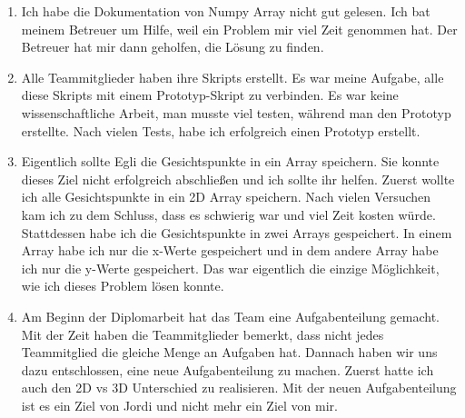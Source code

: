 \begin{itemize}
\begin{enumerate}
	\item Ich habe die Dokumentation von Numpy Array nicht gut gelesen. Ich bat meinem Betreuer um Hilfe, weil ein Problem mir viel Zeit genommen hat. Der Betreuer hat mir dann geholfen, die L\"osung zu finden. 
	
	\item Alle Teammitglieder haben ihre Skripts erstellt. Es war meine Aufgabe, alle diese Skripts mit einem Prototyp-Skript zu verbinden. Es war keine wissenschaftliche Arbeit, man musste viel testen, w\"ahrend man den Prototyp erstellte. Nach vielen Tests, habe ich erfolgreich einen Prototyp erstellt.
	
	\item Eigentlich sollte Egli die Gesichtspunkte in ein Array speichern. Sie konnte dieses Ziel nicht erfolgreich abschlie{\ss}en und ich sollte ihr helfen. Zuerst wollte ich alle Gesichtspunkte in ein 2D Array speichern. Nach vielen Versuchen kam ich zu dem Schluss, dass es schwierig war und viel Zeit kosten w\"urde. Stattdessen habe ich die Gesichtspunkte in zwei Arrays gespeichert. In einem Array habe ich nur die x-Werte gespeichert und in dem andere Array habe ich nur die y-Werte gespeichert. Das war eigentlich die einzige M\"oglichkeit, wie ich dieses Problem l\"osen konnte. 
	
	\item Am Beginn der Diplomarbeit hat das Team eine Aufgabenteilung gemacht. Mit der Zeit haben die Teammitglieder bemerkt, dass nicht jedes Teammitglied die gleiche Menge an Aufgaben hat. Dannach haben wir uns dazu entschlossen, eine neue Aufgabenteilung zu machen. Zuerst hatte ich auch den 2D vs 3D Unterschied zu realisieren. Mit der neuen Aufgabenteilung ist es ein Ziel von Jordi und nicht mehr ein Ziel von mir. 
\end{enumerate}
\end{itemize}
